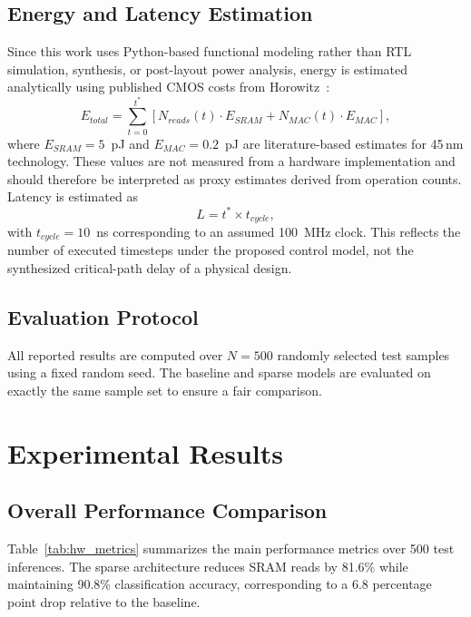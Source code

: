 \documentclass[conference]{IEEEtran}
\begin{document}
\subsection{Energy and Latency Estimation}
Since this work uses Python-based functional modeling rather than RTL simulation, synthesis, or post-layout power analysis, energy is estimated analytically using published CMOS costs from Horowitz~\cite{horowitz2014energy}:
\begin{equation}
E_{total} = \sum_{t=0}^{t^*} \left[ N_{reads}(t) \cdot E_{SRAM} + N_{MAC}(t) \cdot E_{MAC} \right],
\end{equation}
where $E_{SRAM}=5$~pJ and $E_{MAC}=0.2$~pJ are literature-based estimates for 45\,nm technology. These values are not measured from a hardware implementation and should therefore be interpreted as proxy estimates derived from operation counts. Latency is estimated as
\begin{equation}
L = t^* \times t_{cycle},
\end{equation}
with $t_{cycle}=10$~ns corresponding to an assumed 100~MHz clock. This reflects the number of executed timesteps under the proposed control model, not the synthesized critical-path delay of a physical design.

\subsection{Evaluation Protocol}
All reported results are computed over $N=500$ randomly selected test samples using a fixed random seed. The baseline and sparse models are evaluated on exactly the same sample set to ensure a fair comparison.

\section{Experimental Results}

\subsection{Overall Performance Comparison}
Table~\ref{tab:hw_metrics} summarizes the main performance metrics over 500 test inferences. The sparse architecture reduces SRAM reads by 81.6\% while maintaining 90.8\% classification accuracy, corresponding to a 6.8 percentage point drop relative to the baseline.
\end{document}
